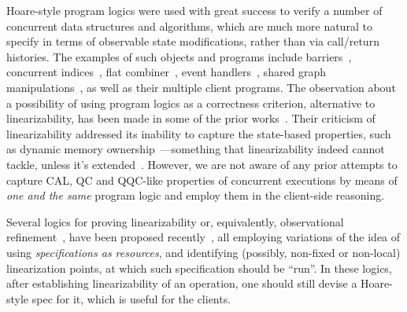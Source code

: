 Hoare-style program logics were used with great success to verify a
number of concurrent data structures and algorithms, which are much
more natural to specify in terms of observable state modifications,
rather than via call/return histories. The examples of such objects
and programs include
barriers~\cite{Dodds-al:POPL11,Hobor-Gherghina:ESOP11}, concurrent
indices~\cite{ArrozPincho-al:OOPSLA11}, flat
combiner~\cite{Turon-al:ICFP13,Sergey-al:ESOP15}, event
handlers~\cite{Svendsen-Birkedal:ESOP14}, shared graph
manipulations~\cite{Raad-al:ESOP15,Sergey-al:PLDI15}, as well as their
multiple client programs.
%
The observation about a possibility of using program logics as a
correctness criterion, alternative to linearizability, has been made
in some of the prior
works~\cite{Jacobs-Piessens:POPL11,ArrozPincho-al:OOPSLA11,Svendsen-al:ESOP13}.
%
Their criticism of linearizability addressed its inability to capture
the state-based properties, such as dynamic memory
ownership~\cite{Jacobs-Piessens:POPL11}---something that
linearizability indeed cannot tackle, unless it's
extended~\cite{Gotsman-Yang:CONCUR12}.
%
However, we are not aware of any prior attempts to capture CAL, QC and
QQC-like properties of concurrent executions by means of \emph{one and
  the same} program logic and employ them in the client-side
reasoning.

%

Several logics for proving linearizability or, equivalently,
observational refinement~\cite{Filipovic-al:TCS10,Turon-al:POPL13},
have been proposed
recently~\cite{Turon-al:ICFP13,Liang-Feng:PLDI13,Vafeiadis:PhD}, all
employing variations of the idea of using \emph{specifications as
  resources}, and identifying (possibly, non-fixed or non-local)
linearization points, at which such specification should be ``run''.
%
In these logics, after establishing linearizability of an operation,
one should still devise a Hoare-style spec for it, which is useful for
the clients.

